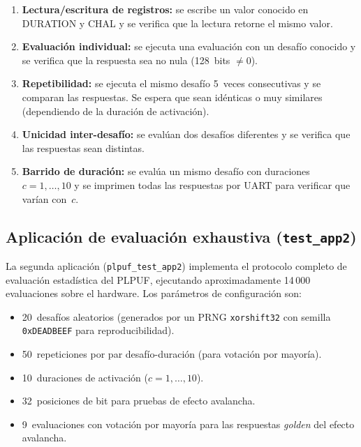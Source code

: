 \begin{enumerate}
  \item \textbf{Lectura/escritura de registros:} se escribe un valor conocido
    en DURATION y CHAL y se verifica que la lectura retorne el mismo valor.

  \item \textbf{Evaluación individual:} se ejecuta una evaluación con un
    desafío conocido y se verifica que la respuesta sea no nula (128~bits
    $\neq 0$).

  \item \textbf{Repetibilidad:} se ejecuta el mismo desafío 5~veces
    consecutivas y se comparan las respuestas. Se espera que sean idénticas o
    muy similares (dependiendo de la duración de activación).

  \item \textbf{Unicidad inter-desafío:} se evalúan dos desafíos diferentes y
    se verifica que las respuestas sean distintas.

  \item \textbf{Barrido de duración:} se evalúa un mismo desafío con
    duraciones $c = 1, \ldots, 10$ y se imprimen todas las respuestas por
    UART para verificar que varían con~$c$.
\end{enumerate}

\subsection{Aplicación de evaluación exhaustiva (\texttt{test\_app2})}
\label{sec:test_app2}

La segunda aplicación (\texttt{plpuf\_test\_app2}) implementa el protocolo
completo de evaluación estadística del PLPUF, ejecutando aproximadamente
14\,000 evaluaciones sobre el hardware. Los parámetros de configuración son:

\begin{itemize}
  \item 20~desafíos aleatorios (generados por un PRNG \texttt{xorshift32}
    con semilla \texttt{0xDEADBEEF} para reproducibilidad).
  \item 50~repeticiones por par desafío-duración (para votación por mayoría).
  \item 10~duraciones de activación ($c = 1, \ldots, 10$).
  \item 32~posiciones de bit para pruebas de efecto avalancha.
  \item 9~evaluaciones con votación por mayoría para las respuestas
    \textit{golden} del efecto avalancha.
\end{itemize}

